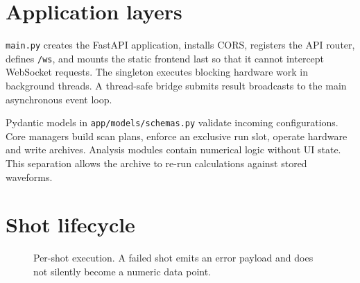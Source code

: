 \documentclass[11pt,oneside,openany]{book}
\newcommand{\code}[1]{\texttt{\detokenize{#1}}}
\newcommand{\pathcode}[1]{\nolinkurl{#1}}
\begin{document}
\section{Application layers}
\pathcode{main.py} creates the FastAPI application, installs CORS, registers the API
router, defines \pathcode{/ws}, and mounts the static frontend last so that it cannot
intercept WebSocket requests. The singleton \code{ExperimentManager} executes blocking
hardware work in background threads. A thread-safe bridge submits result broadcasts to
the main asynchronous event loop.

Pydantic models in \pathcode{app/models/schemas.py} validate incoming configurations.
Core managers build scan plans, enforce an exclusive run slot, operate hardware and
write archives. Analysis modules contain numerical logic without UI state. This
separation allows the archive to re-run calculations against stored waveforms.

\section{Shot lifecycle}
\begin{figure}[htbp]
\centering
{}
\caption{Per-shot execution. A failed shot emits an error payload and does not silently
become a numeric data point.}
\label{fig:shot-life}
\end{figure}
\end{document}
